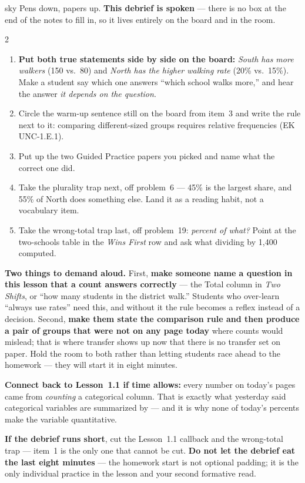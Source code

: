 \documentclass[10pt]{article}
\begin{document}
\boxguard
\begin{skillbox}{sky}
Pens down, papers up. \textbf{This debrief is spoken} --- there is no box at the end of the
notes to fill in, so it lives entirely on the board and in the room.
\begin{multicols}{2}
\begin{enumerate}[leftmargin=1.3em, nosep, itemsep=3pt]
  \item \textbf{Put both true statements side by side on the board:} \emph{South has more
        walkers} (150 vs.\ 80) and \emph{North has the higher walking rate} (20\% vs.\ 15\%).
        Make a student say which one answers ``which school walks more,'' and hear the answer
        \emph{it depends on the question}.
  \item Circle the warm-up sentence still on the board from item~3 and write the rule next to
        it: comparing different-sized groups requires relative frequencies (EK UNC-1.E.1).
  \item Put up the two Guided Practice papers you picked and name what the correct one did.
  \item Take the plurality trap next, off problem~6 --- 45\% is the largest share, and 55\% of
        North does something else. Land it as a reading habit, not a vocabulary item.
  \item Take the wrong-total trap last, off problem~19: \emph{percent of what?} Point at the
        two-schools table in the \emph{Wins First} row and ask what dividing by 1,400 computed.
\end{enumerate}
\columnbreak
\textbf{Two things to demand aloud.} First, \textbf{make someone name a question in this lesson
that a count answers correctly} --- the Total column in \emph{Two Shifts}, or ``how many students
in the district walk.'' Students who over-learn ``always use rates'' need this, and without it
the rule becomes a reflex instead of a decision. Second, \textbf{make them state the comparison
rule and then produce a pair of groups that were not on any page today} where counts would
mislead; that is where transfer shows up now that there is no transfer set on paper. Hold the
room to both rather than letting students race ahead to the homework --- they will start it in
eight minutes.

\textbf{Connect back to Lesson~1.1 if time allows:} every number on today's pages came from
\emph{counting} a categorical column. That is exactly what yesterday said categorical variables
are summarized by --- and it is why none of today's percents make the variable quantitative.

\textbf{If the debrief runs short}, cut the Lesson~1.1 callback and the wrong-total trap ---
item~1 is the only one that cannot be cut. \textbf{Do not let the debrief eat the last eight
minutes} --- the homework start is not optional padding; it is the only individual practice in
the lesson and your second formative read.
\end{multicols}
\end{skillbox}
\end{document}
